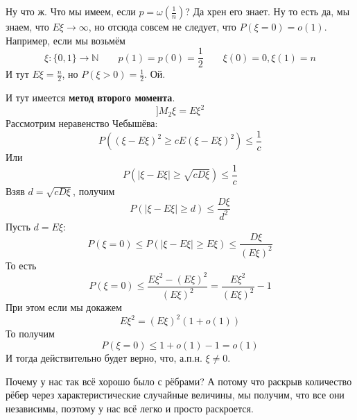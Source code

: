 \documentclass{article}
\begin{document}
    \begin{example}
        Ну что ж. Что мы имеем, если $p=\omega\left(\frac1n\right)$? Да хрен его знает. Ну то есть да, мы знаем, что $E\xi\rightarrow\infty$, но отсюда совсем не следует, что $P(\xi=0)=o(1)$. Например, если мы возьмём
        $$
        \xi\colon\{0,1\}\to\mathbb N\qquad p(1)=p(0)=\frac12\qquad\xi(0)=0,\xi(1)=n
        $$
        И тут $E\xi=\frac n2$, но $P(\xi>0)=\frac12$. Ой.
    \end{example}
    \begin{remark}
        И тут имеется \textbf{метод второго момента}.
        $$
        ]M_2\xi=E\xi^2
        $$
        Рассмотрим неравенство Чебышёва:
        $$
        P((\xi-E\xi)^2\geqslant cE(\xi-E\xi)^2)\leqslant\frac1c
        $$
        Или
        $$
        P(|\xi-E\xi|\geqslant\sqrt{cD\xi})\leqslant\frac1c
        $$
        Взяв $d=\sqrt{cD\xi}$, получим
        $$
        P(|\xi-E\xi|\geqslant d)\leqslant\frac{D\xi}{d^2}
        $$
        Пусть $d=E\xi$:
        $$
        P(\xi=0)\leqslant P(|\xi-E\xi|\geqslant E\xi)\leqslant\frac{D\xi}{(E\xi)^2}
        $$
        То есть
        $$
        P(\xi=0)\leqslant\frac{E\xi^2-(E\xi)^2}{(E\xi)^2}=\frac{E\xi^2}{(E\xi)^2}-1
        $$
        При этом если мы докажем
        $$
        E\xi^2=(E\xi)^2(1+o(1))
        $$
        То получим
        $$
        P(\xi=0)\leqslant 1+o(1)-1=o(1)
        $$
        И тогда действительно будет верно, что, а.п.н. $\xi\neq0$.
    \end{remark}
    \begin{remark}
        Почему у нас так всё хорошо было с рёбрами? А потому что раскрыв количество рёбер через характеристические случайные величины, мы получим, что все они независимы, поэтому у нас всё легко и просто раскроется.
    \end{remark}
\end{document}
